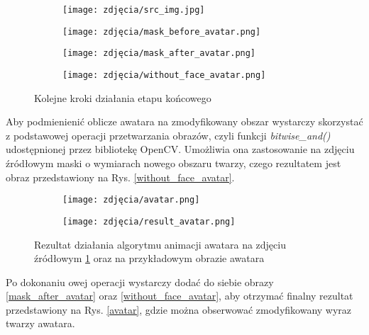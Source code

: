 \begin{figure}[h]
	\centering
	\begin{subfigure}{0.35\textwidth}
		\centering
		\texttt{[image: zdjęcia/src\_img.jpg]}
		\subcaption{\label{src_img}}
	\end{subfigure}
	\begin{subfigure}{0.35\textwidth}
		\centering
		\texttt{[image: zdjęcia/mask\_before\_avatar.png]}
		\subcaption{\label{mask_before_avatar}}
	\end{subfigure}
	\begin{subfigure}{0.35\textwidth}
		\centering
		\texttt{[image: zdjęcia/mask\_after\_avatar.png]}
		\subcaption{\label{mask_after_avatar}}
	\end{subfigure}
	\begin{subfigure}{0.35\textwidth}
		\centering
		\texttt{[image: zdjęcia/without\_face\_avatar.png]}
		\subcaption{\label{without_face_avatar}}
	\end{subfigure}
	
	\caption{\label{fig:masks}Kolejne kroki działania etapu końcowego}
\end{figure}

Aby podmienienić oblicze awatara na zmodyfikowany obszar wystarczy skorzystać z podstawowej operacji przetwarzania obrazów, czyli funkcji \textit{bitwise\_and()} udostępnionej przez bibliotekę OpenCV. Umożliwia ona zastosowanie na zdjęciu źródłowym maski o wymiarach nowego obszaru twarzy, czego rezultatem jest obraz przedstawiony na Rys. \ref{without_face_avatar}.

\begin{figure}[h]
	\centering
	\begin{subfigure}{0.35\textwidth}
		\centering
		\texttt{[image: zdjęcia/avatar.png]}
		\subcaption{\label{avatar}}
	\end{subfigure}
	\begin{subfigure}{0.35\textwidth}
		\centering
		\texttt{[image: zdjęcia/result\_avatar.png]}
		\subcaption{\label{result_avatar}}
	\end{subfigure}
	
	\caption{\label{fig:result}Rezultat działania algorytmu animacji awatara \protect{} na zdjęciu źródłowym \ref{fig:masks} \protect{} oraz na przykładowym obrazie awatara \protect{}}
\end{figure}

Po dokonaniu owej operacji wystarczy dodać do siebie obrazy \ref{mask_after_avatar} oraz \ref{without_face_avatar}, aby otrzymać finalny rezultat przedstawiony na Rys. \ref{avatar}, gdzie można obserwować zmodyfikowany wyraz twarzy awatara.

